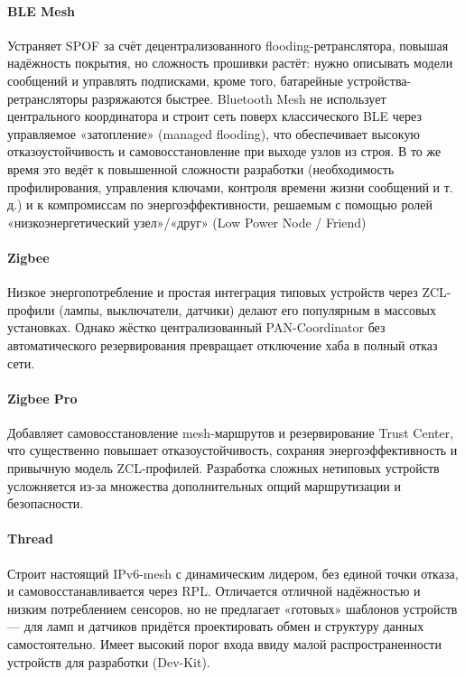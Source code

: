 \documentclass[14pt, a4paper]{extreport}
\begin{document}
\paragraph{BLE Mesh}
Устраняет SPOF за счёт децентрализованного flooding-ретранслятора, повышая надёжность покрытия, но сложность прошивки растёт: нужно описывать модели сообщений и управлять подписками, кроме того, батарейные устройства-ретрансляторы разряжаются быстрее.
Bluetooth Mesh не использует центрального координатора и строит сеть поверх классического BLE через управляемое «затопление» (managed flooding), что обеспечивает высокую отказоустойчивость и самовосстановление при выходе узлов из строя. В то же время это ведёт к повышенной сложности разработки (необходимость профилирования, управления ключами, контроля времени жизни сообщений и т. д.) и к компромиссам по энергоэффективности, решаемым с помощью ролей «низкоэнергетический узел»/«друг» (Low Power Node / Friend)

\paragraph{Zigbee}
Низкое энергопотребление и простая интеграция типовых устройств через ZCL-профили (лампы, выключатели, датчики) делают его популярным в массовых установках. Однако жёстко централизованный PAN-Coordinator без автоматического резервирования превращает отключение хаба в полный отказ сети.

\paragraph{Zigbee Pro}
Добавляет самовосстановление mesh-маршрутов и резервирование Trust Center, что существенно повышает отказоустойчивость, сохраняя энергоэффективность и привычную модель ZCL-профилей. Разработка сложных нетиповых устройств усложняется из-за множества дополнительных опций маршрутизации и безопасности.

\paragraph{Thread}
Строит настоящий IPv6-mesh с динамическим лидером, без единой точки отказа, и самовосстанавливается через RPL. Отличается отличной надёжностью и низким потреблением сенсоров, но не предлагает «готовых» шаблонов устройств — для ламп и датчиков придётся проектировать обмен и структуру данных самостоятельно. Имеет высокий порог входа ввиду малой распространенности устройств для разработки (Dev-Kit).
\end{document}
